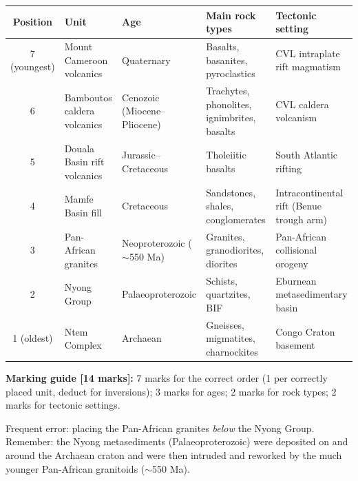 \documentclass[11pt]{article}
\begin{document}
\begin{corrige}
\begin{center}
\begin{tabularx}{\linewidth}{|c|X|l|X|X|}
\hline
\rowcolor{popblueL} \textbf{Position} & \textbf{Unit} & \textbf{Age} & \textbf{Main rock types} & \textbf{Tectonic setting} \\
\hline
7 (youngest) & Mount Cameroon volcanics & Quaternary & Basalts, basanites, pyroclastics & CVL intraplate rift magmatism \\
\hline
6 & Bamboutos caldera volcanics & Cenozoic (Miocene–Pliocene) & Trachytes, phonolites, ignimbrites, basalts & CVL caldera volcanism \\
\hline
5 & Douala Basin rift volcanics & Jurassic–Cretaceous & Tholeiitic basalts & South Atlantic rifting \\
\hline
4 & Mamfe Basin fill & Cretaceous & Sandstones, shales, conglomerates & Intracontinental rift (Benue trough arm) \\
\hline
3 & Pan-African granites & Neoproterozoic ($\sim$550 Ma) & Granites, granodiorites, diorites & Pan-African collisional orogeny \\
\hline
2 & Nyong Group & Palaeoproterozoic & Schists, quartzites, BIF & Eburnean metasedimentary basin \\
\hline
1 (oldest) & Ntem Complex & Archaean & Gneisses, migmatites, charnockites & Congo Craton basement \\
\hline
\end{tabularx}
\end{center}

\textbf{Marking guide [14 marks]:} 7 marks for the correct order (1 per correctly placed unit, deduct for inversions); 3 marks for ages; 2 marks for rock types; 2 marks for tectonic settings.

\begin{attention}
Frequent error: placing the Pan-African granites \emph{below} the Nyong Group. Remember: the Nyong metasediments (Palaeoproterozoic) were deposited on and around the Archaean craton and were then intruded and reworked by the much younger Pan-African granitoids ($\sim$550 Ma).
\end{attention}
\end{corrige}
\end{document}
